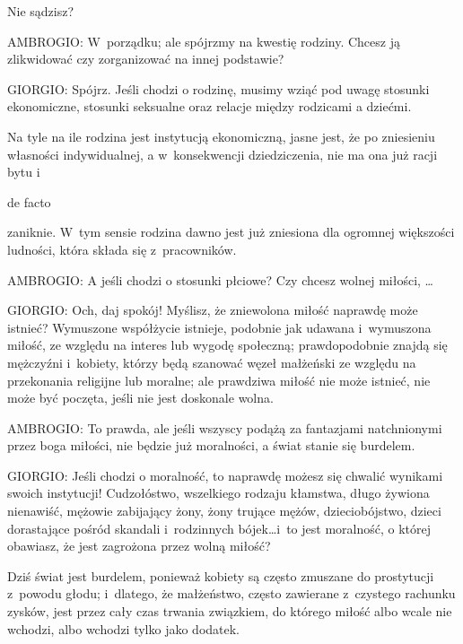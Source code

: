 \documentclass[oneside,polish,11pt,sfheadings]{mwbk}
\begin{document}
 
Nie sądzisz? 




 
\noindent AMBROGIO: W~porządku; ale spójrzmy na kwestię rodziny. Chcesz ją zlikwidować czy zorganizować na innej podstawie? 




 
\noindent GIORGIO: Spójrz. Jeśli chodzi o rodzinę, musimy wziąć pod uwagę stosunki ekonomiczne, stosunki seksualne oraz relacje
między rodzicami a dziećmi. 

 
Na tyle na ile rodzina jest instytucją ekonomiczną, jasne jest, że po zniesieniu własności indywidualnej, a w~konsekwencji dziedziczenia, nie ma ona już racji bytu i~\begin{itshape}de facto \end{itshape}
zaniknie. W~tym sensie rodzina dawno jest już zniesiona dla ogromnej większości ludności, która składa się z~pracowników. 




 
\noindent AMBROGIO: A jeśli chodzi o stosunki płciowe? Czy chcesz wolnej miłości, \ldots 




 
\noindent GIORGIO: Och, daj spokój! Myślisz, że zniewolona miłość naprawdę może istnieć? Wymuszone współżycie istnieje, podobnie
jak udawana i~wymuszona miłość, ze względu na interes lub wygodę społeczną; prawdopodobnie znajdą się mężczyźni i~kobiety, którzy będą szanować węzeł małżeński ze względu na przekonania religijne lub moralne; ale prawdziwa miłość nie
może istnieć, nie może być poczęta, jeśli nie jest doskonale wolna. 




 
\noindent AMBROGIO: To prawda, ale jeśli wszyscy podążą za fantazjami natchnionymi przez boga miłości, nie będzie już moralności,
a świat stanie się burdelem. 




 
\noindent GIORGIO: Jeśli chodzi o moralność, to naprawdę możesz się chwalić wynikami swoich instytucji! Cudzołóstwo, wszelkiego
rodzaju kłamstwa, długo żywiona nienawiść, mężowie zabijający żony, żony trujące mężów, dzieciobójstwo, dzieci
dorastające pośród skandali i~rodzinnych bójek\ldots i~to jest moralność, o której obawiasz, że jest zagrożona przez wolną
miłość? 

 
Dziś świat jest burdelem, ponieważ kobiety są często zmuszane do prostytucji z~powodu głodu; i~dlatego, że małżeństwo,
często zawierane z~czystego rachunku zysków, jest przez cały czas trwania związkiem, do którego miłość albo wcale nie
wchodzi, albo wchodzi tylko jako dodatek. 
\end{document}
